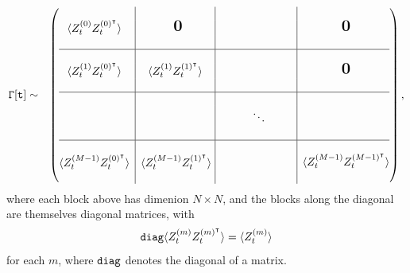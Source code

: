 \documentclass{amsart}
\newcommand{\bigzero}{\mbox{\normalfont\Large\bfseries 0}}
\begin{document}
\begin{eqnarray*}
{\tt \Gamma[t]} &\sim&
\left(\begin{array}{@{}c|c@{}|c@{}|c@{}}
&&&\\
  \begin{matrix}
\langle Z_{t}^{(0)}Z_{t}^{(0)^\intercal}\rangle 
  \end{matrix}
  & 
  \bigzero
  &
  & 
  \bigzero \\
  &&&\\
  \hline
  &&&\\
  \begin{matrix}
  \langle Z_{t}^{(1)}Z_{t}^{(0)^\intercal}\rangle 
  \end{matrix}
  & 
  \begin{matrix}
  \langle Z_{t}^{(1)}Z_{t}^{(1)^\intercal}\rangle 
  \end{matrix}\,\,\,
  & 
  &
  \bigzero
  \\
  &&&\\
  \hline
  &&&\\
  &
  &
  \hspace{1cm}\ddots\hspace{1cm}
  &
  \\
  &&&\\
\hline
&&&\\
\begin{matrix}
  \langle Z_{t}^{(M-1)}Z_{t}^{(0)^\intercal}\rangle 
  \end{matrix}
  &
  \begin{matrix}
  \langle Z_{t}^{(M-1)}Z_{t}^{(1)^\intercal}\rangle 
  \end{matrix}\,\,
  &
  &
\langle Z_{t}^{(M-1)}Z_{t}^{(M-1)^\intercal}\rangle \\
&&&\\
\end{array}\right),
\end{eqnarray*}
where each block above has dimenion $N\times N$, and the blocks along 
the diagonal are themselves diagonal matrices, with
\[
{\tt diag}\langle Z_{t}^{(m)}Z_{t}^{(m)^\intercal}\rangle = \langle Z_{t}^{(m)}\rangle 
\]
for each $m$, where ${\tt diag}$ denotes the diagonal of a matrix.  
\end{document}

